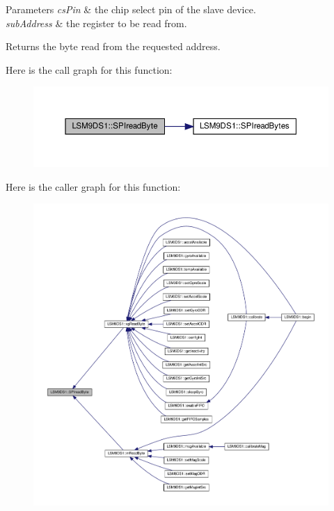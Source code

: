 \begin{DoxyParams}{Parameters}
{\em cs\+Pin} & the chip select pin of the slave device. \\
\hline
{\em sub\+Address} & the register to be read from. \\
\hline
\end{DoxyParams}
\begin{DoxyReturn}{Returns}
the byte read from the requested address. 
\end{DoxyReturn}
Here is the call graph for this function\+:
\nopagebreak
\begin{figure}[H]
\begin{center}
\leavevmode
\includegraphics[width=350pt]{classLSM9DS1_a6f0f50bb5e9b702d5a19c7441a3f9d8b_cgraph}
\end{center}
\end{figure}
Here is the caller graph for this function\+:
\nopagebreak
\begin{figure}[H]
\begin{center}
\leavevmode
\includegraphics[width=350pt]{classLSM9DS1_a6f0f50bb5e9b702d5a19c7441a3f9d8b_icgraph}
\end{center}
\end{figure}
\mbox{\label{classLSM9DS1_a26c0f164454eba84e6486033b7061d11}} 
